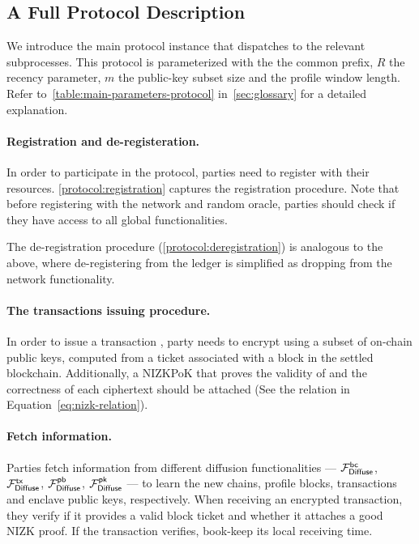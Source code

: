 \subsection{A Full Protocol Description}
\label{subsec:protocol-desc}

We introduce the main \protocFairLedger protocol instance that dispatches to the relevant subprocesses.
%
This protocol is parameterized with the \CPLen the common prefix, $R$ the recency parameter, $m$ the public-key subset size and \PBWindowLen the profile window length.
%
Refer to~\cref{table:main-parameters-protocol} in~\cref{sec:glossary} for a detailed explanation.



\paragraph{Registration and de-registeration.}
%
In order to participate in the protocol, parties need to register with their resources.
%
\cref{protocol:registration} captures the registration procedure.
%
Note that before registering with the network and random oracle, parties should check if they have access to all global functionalities.



The de-registration procedure (\cref{protocol:deregistration}) is analogous to the above, where de-registering from the ledger is simplified as dropping from the network functionality.



\paragraph{The transactions issuing procedure.}
%
In order to issue a transaction \tx, party \party needs to encrypt \tx using a subset of on-chain public keys, computed from a ticket associated with a block in the settled blockchain.
%
Additionally, a NIZKPoK that proves the validity of \tx and the correctness of each ciphertext should be attached (See the relation in Equation~\eqref{eq:nizk-relation}).



\paragraph{Fetch information.}
%
Parties fetch information from different diffusion functionalities --- $\mathcal{F}_{\mathsf{Diffuse}}^{\mathsf{bc}}$, $\mathcal{F}_{\mathsf{Diffuse}}^{\mathsf{tx}}$, $\mathcal{F}_{\mathsf{Diffuse}}^{\mathsf{pb}}$, $\mathcal{F}_{\mathsf{Diffuse}}^\mathsf{pk}$ --- to learn the new chains, profile blocks, transactions and enclave public keys, respectively.
%
When receiving an encrypted transaction, they verify if it provides a valid block ticket and whether it attaches a good NIZK proof.
%
If the transaction verifies, book-keep its local receiving time.

